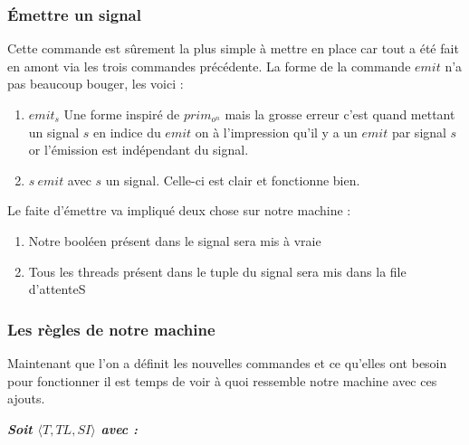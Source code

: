 \documentclass[10pt,a4paper]{article}
\begin{document}
					
					
					
			\subsubsection{Émettre un signal}
					
				Cette commande est sûrement la plus simple à mettre en place car tout a été fait en amont via les trois commandes précédente. La forme de la commande $emit$ n'a pas beaucoup bouger, les voici :
				\begin{enumerate}
					\item $emit_{s}$ Une forme inspiré de $prim_{o^{n}}$ mais la grosse erreur c'est quand mettant un signal $s$ en indice du $emit$ on à l'impression qu'il y a un $emit$ par signal $s$ or l'émission est indépendant du signal.
					\item $s~emit$ avec $s$ un signal. Celle-ci est clair et fonctionne bien. 
				\end{enumerate}
				\medbreak
					
				Le faite d'émettre va impliqué deux chose sur notre machine :
				\begin{enumerate}					
					\item Notre booléen présent dans le signal sera mis à vraie
					\item Tous les threads présent dans le tuple du signal sera mis dans la file d'attenteS 
				\end{enumerate} 
				\bigbreak
				\bigbreak
				
				
					
					
			\subsubsection{Les règles de notre machine}
				
				Maintenant que l'on a définit les nouvelles commandes et ce qu'elles ont besoin pour fonctionner il est temps de voir à quoi ressemble notre machine avec ces ajouts.
				\bigbreak
					
					
				\textbf{\textit{Soit $\langle T,TL,SI\rangle$ avec :}}
					
\end{document}
